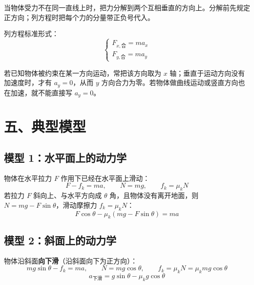 当物体受力不在同一直线上时，把力分解到两个互相垂直的方向上。分解前先规定正方向；列方程时把每个力的分量带正负号代入。

\begin{center}


\label{fig:orthogonal-decomp}
\end{center}

\noindent 列方程标准形式：
\[
\begin{cases}
F_{x,\text{合}} = ma_x \\
F_{y,\text{合}} = ma_y
\end{cases}
\]

若已知物体被约束在某一方向运动，常把该方向取为 $x$ 轴；垂直于运动方向没有加速度时，才有 $a_y = 0$，从而 $y$ 方向合力为零。若物体做曲线运动或竖直方向也在加速，就不能直接写 $a_y=0$。

\section*{五、典型模型}

\subsection*{模型 1：水平面上的动力学}

物体在水平拉力 $F$ 作用下已经在水平面上滑动：
\[
F - f_k = ma,\qquad N = mg,\qquad f_k=\mu_k N
\]
若拉力 $F$ 斜向上、与水平方向成 $\theta$ 角，且物体没有离开地面，则 $N = mg - F\sin\theta$，滑动摩擦力 $f_k=\mu_k N$：
\[
F\cos\theta - \mu_k (mg - F\sin\theta) = ma
\]

\begin{center}

\qquad


\label{fig:newton-horizontal-oblique-pull}
\end{center}

\subsection*{模型 2：斜面上的动力学}

物体沿斜面\textbf{向下滑}（沿斜面向下为正方向）：
\[
mg\sin\theta - f_k = ma,\qquad N = mg\cos\theta,\qquad f_k = \mu_k N = \mu_k mg\cos\theta
\]
\[
a_{\text{下滑}} = g\sin\theta - \mu_k g\cos\theta
\]

